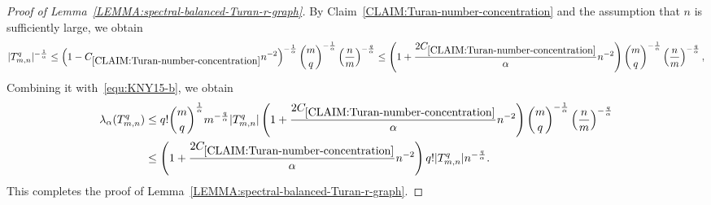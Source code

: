 \documentclass[11pt,a4paper]{article}
\begin{document}
\begin{proof}[Proof of Lemma~\ref{LEMMA:spectral-balanced-Turan-r-graph}]
    By Claim~\ref{CLAIM:Turan-number-concentration} and the assumption that $n$ is sufficiently large, we obtain 
    \begin{align*}
        |T_{m,n}^{q}|^{-\frac{1}{\alpha}}
        \le \left( 1- C_{\ref{CLAIM:Turan-number-concentration}} n^{-2} \right)^{-\frac{1}{\alpha}} \binom{m}{q}^{-\frac{1}{\alpha}} \left(\frac{n}{m}\right)^{-\frac{q}{\alpha}}  
        \le \left( 1 + \frac{2C_{\ref{CLAIM:Turan-number-concentration}}}{\alpha} n^{-2} \right) \binom{m}{q}^{-\frac{1}{\alpha}} \left(\frac{n}{m}\right)^{-\frac{q}{\alpha}},  
    \end{align*}
    Combining it with~\eqref{equ:KNY15-b}, we obtain 
    \begin{align*}
        \lambda_{\alpha}(T_{m,n}^{q}) 
        & \le q!\binom{m}{q}^{\frac{1}{\alpha}}m^{-\frac{q}{\alpha}}|T_{m,n}^{q}| \left( 1 + \frac{2C_{\ref{CLAIM:Turan-number-concentration}}}{\alpha} n^{-2} \right) \binom{m}{q}^{-\frac{1}{\alpha}} \left(\frac{n}{m}\right)^{-\frac{q}{\alpha}} \\
        & \le \left( 1 + \frac{2C_{\ref{CLAIM:Turan-number-concentration}}}{\alpha} n^{-2} \right) q! |T_{m,n}^{q}| n^{-\frac{q}{\alpha}}. 
    \end{align*}
    This completes the proof of Lemma~\ref{LEMMA:spectral-balanced-Turan-r-graph}. 
\end{proof}
\end{document}
